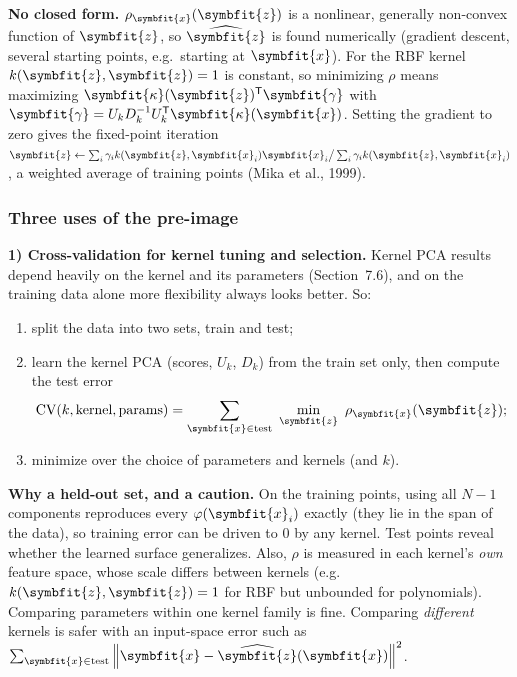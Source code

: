 \documentclass[11pt]{article}
\newcommand{\bm}[1]{\symbfit{#1}}
\newcommand{\vx}{\bm{x}}
\newcommand{\T}{^{\mathsf T}}
\newcommand{\norm}[1]{\left\lVert #1\right\rVert}
\begin{document}
\begin{careful}
\textbf{No closed form.} $\rho_{\vx}(\bm z)$ is a nonlinear, generally non-convex function of $\bm z$, so $\widehat{\bm z}$ is found
numerically (gradient descent, several starting points, e.g.\ starting at $\vx$). For the RBF kernel $k(\bm z,\bm z)=1$ is constant,
so minimizing $\rho$ means maximizing $\bm\kappa(\bm z)\T\bm\gamma$ with $\bm\gamma=U_kD_k^{-1}U_k\T\bm\kappa(\vx)$. Setting the gradient to zero gives the
fixed-point iteration
$\bm z\leftarrow\sum_i\gamma_ik(\bm z,\vx_i)\vx_i\big/\sum_i\gamma_ik(\bm z,\vx_i)$, a weighted average of training points (Mika et al., 1999).
\end{careful}

\subsubsection*{Three uses of the pre-image}

\textbf{1) Cross-validation for kernel tuning and selection.} Kernel PCA results depend heavily on the kernel
and its parameters (Section~7.6), and on the training data alone more flexibility always looks better. So:
\begin{enumerate}[nosep,label=(\roman*)]
\item split the data into two sets, train and test;
\item learn the kernel PCA (scores, $U_k$, $D_k$) from the train set only, then compute the test error
\[
\text{CV}(k,\text{kernel},\text{params})=\sum_{\vx\in\text{test}}\ \min_{\bm z}\ \rho_{\vx}(\bm z);
\]
\item minimize over the choice of parameters and kernels (and $k$).
\end{enumerate}

\begin{careful}
\textbf{Why a held-out set, and a caution.} On the training points, using all $N-1$ components reproduces every
$\varphi(\vx_i)$ exactly (they lie in the span of the data), so training error can be driven to $0$ by any kernel. Test points
reveal whether the learned surface generalizes. Also, $\rho$ is measured in each kernel's \emph{own} feature space,
whose scale differs between kernels (e.g.\ $k(\bm z,\bm z)=1$ for RBF but unbounded for polynomials). Comparing parameters
within one kernel family is fine. Comparing \emph{different} kernels is safer with an input-space error such as
$\sum_{\vx\in\text{test}}\norm{\vx-\widehat{\bm z}(\vx)}^2$.
\end{careful}
\end{document}
